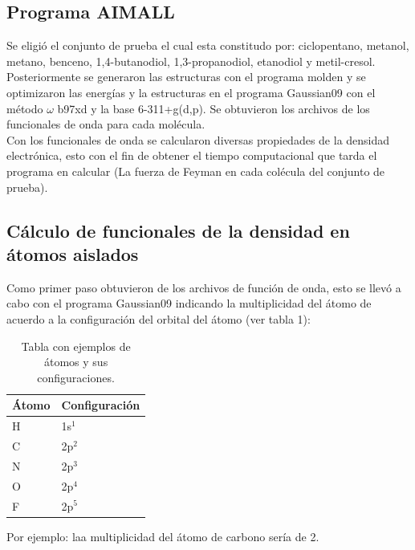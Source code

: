 \documentclass[12pt,letterpaper]{article}
\begin{document}
\subsection{Programa AIMALL}
Se eligió el conjunto de prueba el cual esta constitudo por: ciclopentano, metanol, metano, benceno, 1,4-butanodiol, 1,3-propanodiol, etanodiol y metil-cresol.\\
Posteriormente se generaron las estructuras con el programa molden y se optimizaron las energías y la estructuras en el programa Gaussian09 con el método $\omega$ b97xd y la base 6-311+g(d,p). Se obtuvieron los archivos de los funcionales de onda para cada molécula.\\
Con los funcionales de onda se calcularon diversas propiedades de la densidad electrónica, esto con el fin de obtener el tiempo computacional que tarda el programa en calcular (La fuerza de Feyman en cada colécula del conjunto de prueba).\\

\subsection{Cálculo de funcionales de la densidad en átomos aislados}
Como primer paso obtuvieron de los archivos de función de onda, esto se llevó a cabo con el programa Gaussian09 indicando la multiplicidad del átomo de acuerdo a la configuración del orbital del átomo (ver tabla 1):
\begin{table}[H]
\begin{center}
\begin{tabular}{|l|l|}
\hline
Átomo & Configuración \\
\hline \hline
H & 1s$^1$ \\ \hline
C & 2p$^2$ \\ \hline
N & 2p$^3$ \\ \hline
O & 2p$^4$ \\ \hline
F & 2p$^5$ \\ \hline
\end{tabular}
\caption{Tabla con ejemplos de átomos y sus configuraciones.}
\label{tabla:sencilla}
\end{center}
\end{table}

Por ejemplo: laa multiplicidad del átomo de carbono sería de 2.\\
\end{document}
